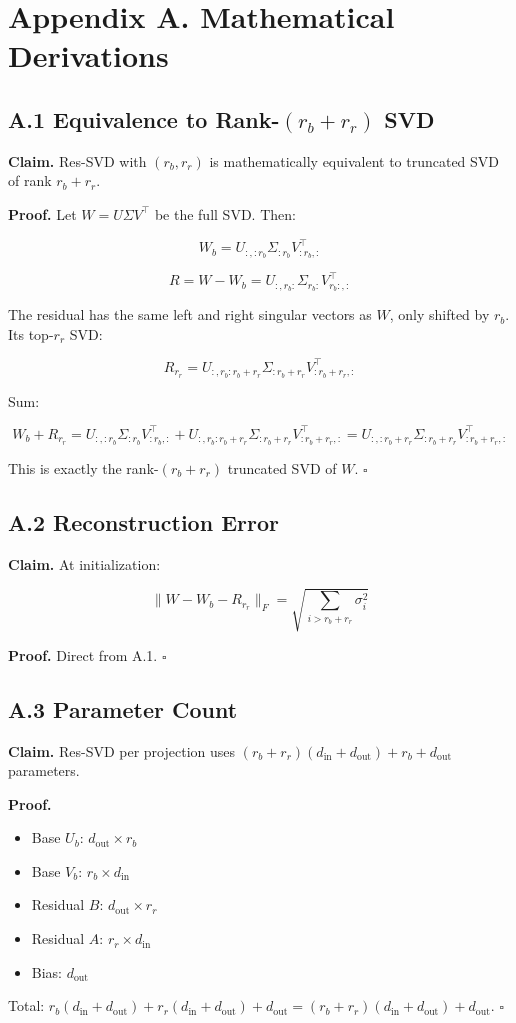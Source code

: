 \section{Appendix A. Mathematical Derivations}

\subsection{A.1 Equivalence to Rank-$(r_b + r_r)$ SVD}

\textbf{Claim.} Res-SVD with $(r_b, r_r)$ is mathematically equivalent to 
truncated SVD of rank $r_b + r_r$.

\textbf{Proof.} Let $W = U \Sigma V^\top$ be the full SVD. Then:

\[
W_b = U_{:, :r_b} \Sigma_{:r_b} V_{:r_b, :}^\top
\tag{A.1}
\]

\[
R = W - W_b = U_{:, r_b:} \Sigma_{r_b:} V_{r_b:, :}^\top
\tag{A.2}
\]

The residual has the same left and right singular vectors as $W$, only 
shifted by $r_b$. Its top-$r_r$ SVD:

\[
R_{r_r} = U_{:, r_b:r_b+r_r} \Sigma_{:r_b+r_r} V_{:r_b+r_r, :}^\top
\tag{A.3}
\]

Sum:

\[
W_b + R_{r_r} = U_{:, :r_b} \Sigma_{:r_b} V_{:r_b, :}^\top + U_{:, r_b:r_b+r_r} \Sigma_{:r_b+r_r} V_{:r_b+r_r, :}^\top = U_{:, :r_b+r_r} \Sigma_{:r_b+r_r} V_{:r_b+r_r, :}^\top
\tag{A.4}
\]

This is exactly the rank-$(r_b + r_r)$ truncated SVD of $W$. $\square$

\subsection{A.2 Reconstruction Error}

\textbf{Claim.} At initialization:

\[
\|W - W_b - R_{r_r}\|_F = \sqrt{\sum_{i > r_b + r_r} \sigma_i^2}
\tag{A.5}
\]

\textbf{Proof.} Direct from A.1. $\square$

\subsection{A.3 Parameter Count}

\textbf{Claim.} Res-SVD per projection uses $(r_b + r_r)(d_\text{in} + d_\text{out}) + r_b + d_\text{out}$ 
parameters.

\textbf{Proof.}
\begin{itemize}
\item Base $U_b$: $d_\text{out} \times r_b$
\item Base $V_b$: $r_b \times d_\text{in}$
\item Residual $B$: $d_\text{out} \times r_r$
\item Residual $A$: $r_r \times d_\text{in}$
\item Bias: $d_\text{out}$

\end{itemize}
Total: $r_b(d_\text{in} + d_\text{out}) + r_r(d_\text{in} + d_\text{out}) + d_\text{out} = (r_b + r_r)(d_\text{in} + d_\text{out}) + d_\text{out}$. $\square$

